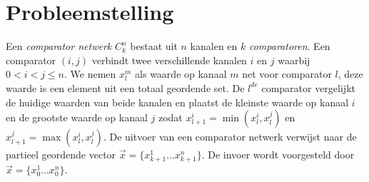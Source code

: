 \documentclass{article}
\begin{document}
\section{Probleemstelling}
Een \textit{comparator netwerk} $C^n_k$ bestaat uit $n$ kanalen en $k$ \textit{comparatoren}.
Een comparator $\left(i, j\right)$ verbindt twee verschillende kanalen $i$ en $j$ waarbij $0 < i < j \leq n$.
We nemen $x_l^m$ als waarde op kanaal $m$ net voor comparator $l$, deze waarde is een element uit een totaal geordende set. 
De $l^{de}$ comparator  vergelijkt de huidige waarden van beide kanalen en plaatst de kleinste waarde op kanaal $i$ en de grootste waarde op kanaal $j$ zodat $x_{l+1}^i = \min(x_l^i,x_l^j)$ en $x_{l+1}^j = \max(x_l^i,x_l^j)$.
De uitvoer van een comparator netwerk verwijst naar de partieel geordende vector $\vec{x} = \{x^1_{k+1} \dots x^n_{k+1} \} $.
De invoer wordt voorgesteld door $\vec{x} = \{x^1_{0} \dots x^n_{0} \} $. 
\end{document}
